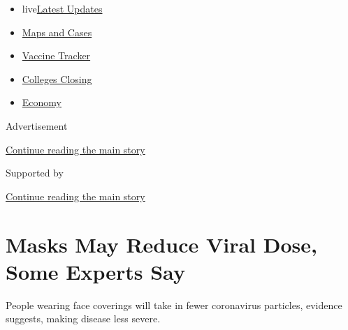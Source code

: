 \begin{itemize}
\tightlist
\item
  live\href{https://www.nytimes3xbfgragh.onion/2020/08/21/world/covid-19-coronavirus.html?name=styln-coronavirus-national\&region=TOP_BANNER\&variant=undefined\&block=storyline_menu_recirc\&action=click\&pgtype=Article\&impression_id=e741d191-e3a9-11ea-9f52-e335c4ed056e}{Latest
  Updates}
\item
  \href{https://www.nytimes3xbfgragh.onion/interactive/2020/us/coronavirus-us-cases.html?name=styln-coronavirus-national\&region=TOP_BANNER\&variant=undefined\&block=storyline_menu_recirc\&action=click\&pgtype=Article\&impression_id=e741f8a0-e3a9-11ea-9f52-e335c4ed056e}{Maps
  and Cases}
\item
  \href{https://www.nytimes3xbfgragh.onion/interactive/2020/science/coronavirus-vaccine-tracker.html?name=styln-coronavirus-national\&region=TOP_BANNER\&variant=undefined\&block=storyline_menu_recirc\&action=click\&pgtype=Article\&impression_id=e741f8a1-e3a9-11ea-9f52-e335c4ed056e}{Vaccine
  Tracker}
\item
  \href{https://www.nytimes3xbfgragh.onion/2020/08/19/us/colleges-closing-covid.html?name=styln-coronavirus-national\&region=TOP_BANNER\&variant=undefined\&block=storyline_menu_recirc\&action=click\&pgtype=Article\&impression_id=e741f8a2-e3a9-11ea-9f52-e335c4ed056e}{Colleges
  Closing}
\item
  \href{https://www.nytimes3xbfgragh.onion/live/2020/08/21/business/stock-market-today-coronavirus?name=styln-coronavirus-national\&region=TOP_BANNER\&variant=undefined\&block=storyline_menu_recirc\&action=click\&pgtype=Article\&impression_id=e741f8a3-e3a9-11ea-9f52-e335c4ed056e}{Economy}
\end{itemize}

Advertisement

\protect\hyperlink{after-top}{Continue reading the main story}

Supported by

\protect\hyperlink{after-sponsor}{Continue reading the main story}

\hypertarget{masks-may-reduce-viral-dose-some-experts-say}{%
\section{Masks May Reduce Viral Dose, Some Experts
Say}\label{masks-may-reduce-viral-dose-some-experts-say}}

People wearing face coverings will take in fewer coronavirus particles,
evidence suggests, making disease less severe.


